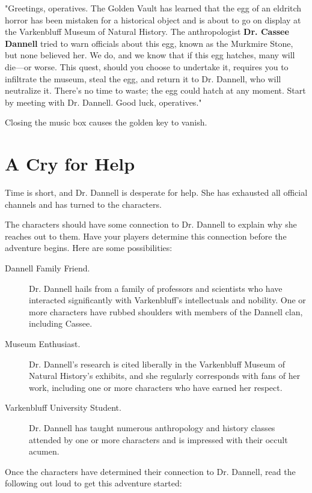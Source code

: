 \documentclass[10pt,a4paper,twoside,bg=print,twocolumn,openany,nodeprecatedcode]{dndbook}
\begin{document}
\begin{DndReadAloud}{}
"Greetings, operatives. The Golden Vault has learned that the egg of an eldritch horror has been mistaken for a historical object and is about to go on display at the Varkenbluff Museum of Natural History. The anthropologist \textbf{Dr. Cassee Dannell} tried to warn officials about this egg, known as the Murkmire Stone, but none believed her. We do, and we know that if this egg hatches, many will die—or worse. This quest, should you choose to undertake it, requires you to infiltrate the museum, steal the egg, and return it to Dr. Dannell, who will neutralize it. There's no time to waste; the egg could hatch at any moment. Start by meeting with Dr. Dannell. Good luck, operatives."

\end{DndReadAloud}

Closing the music box causes the golden key to vanish.

\section{A Cry for Help}
Time is short, and Dr. Dannell is desperate for help. She has exhausted all official channels and has turned to the characters.

The characters should have some connection to Dr. Dannell to explain why she reaches out to them. Have your players determine this connection before the adventure begins. Here are some possibilities:


\begin{description}
\item[Dannell Family Friend.]
Dr. Dannell hails from a family of professors and scientists who have interacted significantly with Varkenbluff's intellectuals and nobility. One or more characters have rubbed shoulders with members of the Dannell clan, including Cassee.
\item[Museum Enthusiast.]
Dr. Dannell's research is cited liberally in the Varkenbluff Museum of Natural History's exhibits, and she regularly corresponds with fans of her work, including one or more characters who have earned her respect.
\item[Varkenbluff University Student.]
Dr. Dannell has taught numerous anthropology and history classes attended by one or more characters and is impressed with their occult acumen.
\end{description}

Once the characters have determined their connection to Dr. Dannell, read the following out loud to get this adventure started:
\end{document}
